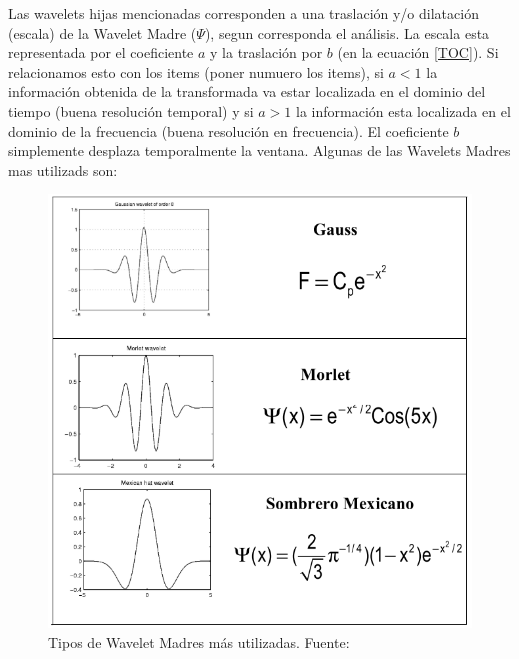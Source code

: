 \documentclass{article}
\begin{document}
Las wavelets hijas mencionadas corresponden a una traslación y/o dilatación (escala) de la Wavelet Madre ($\Psi$), segun corresponda el análisis. La escala esta representada por el coeficiente $a$ y la traslación por $b$ (en la ecuación \ref{TOC}). Si relacionamos esto con los items (poner numuero los items), si $a<1$ la información obtenida de la transformada va estar localizada en el dominio del tiempo (buena resolución temporal) y si 
$a>1$ la información esta localizada en el dominio de la frecuencia (buena resolución en frecuencia). El coeficiente $b$ simplemente desplaza temporalmente la ventana. Algunas de las Wavelets Madres mas utilizads son:
\begin{figure}[H]
    \centering
    \includegraphics[scale=0.5]{Fig/7}
    \caption{Tipos de Wavelet Madres más utilizadas. Fuente:}
    \label{WM}
\end{figure}
\end{document}
